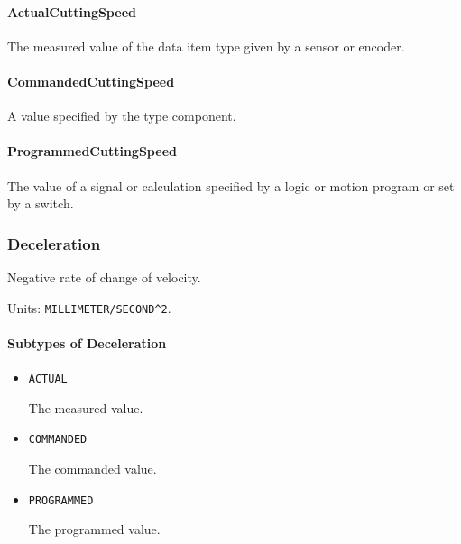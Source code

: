 \paragraph{ActualCuttingSpeed}\mbox{}
\label{sec:ActualCuttingSpeed}


The measured value of the data item type given by a sensor or encoder.


\paragraph{CommandedCuttingSpeed}\mbox{}
\label{sec:CommandedCuttingSpeed}


A value specified by the  type component.


\paragraph{ProgrammedCuttingSpeed}\mbox{}
\label{sec:ProgrammedCuttingSpeed}


The value of a signal or calculation specified by a logic or motion program or set by a switch.


\subsubsection{Deceleration}
\label{sec:Deceleration}



Negative rate of change of velocity.


Units: \texttt{MILLIMETER/SECOND\^{}2}.

\paragraph{Subtypes of Deceleration}\mbox{}
\label{sec:Subtypes of Deceleration}

\begin{itemize}

\item \texttt{ACTUAL}


The measured value.

\item \texttt{COMMANDED}


The commanded value.

\item \texttt{PROGRAMMED}


The programmed value.


\end{itemize}

